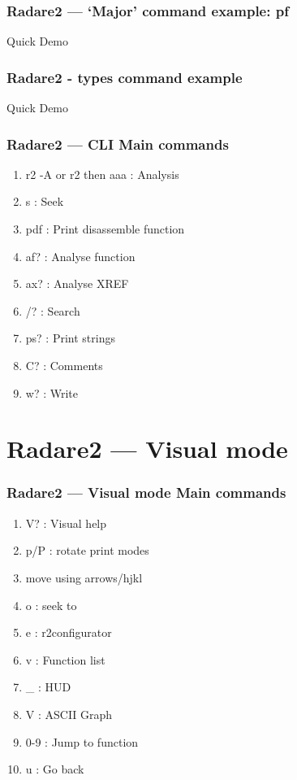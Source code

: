 \documentclass[10pt,pdf,utf8,english,compress,hyperref={unicode}]{beamer}
\begin{document}
\begin{frame}[fragile]
  \frametitle{Radare2 — `Major' command example: pf}
  Quick Demo
\end{frame}

\begin{frame}[fragile]
  \frametitle{Radare2 - types command example}
  Quick Demo
\end{frame}

\begin{frame}[fragile]
  \frametitle{Radare2 — CLI Main commands}
  \begin{enumerate}
   \item r2 -A or r2 then aaa : Analysis
   \item s : Seek
   \item pdf : Print disassemble function
   \item af? : Analyse function
   \item ax? : Analyse XREF
   \item /? : Search
   \item ps? : Print strings
   \item C? : Comments
   \item w? : Write
 \end{enumerate}
\end{frame}

\section{Radare2 — Visual mode}
\begin{frame}[fragile]
  \frametitle{Radare2 — Visual mode Main commands}
  \begin{enumerate}
  \item V? : Visual help
  \item p/P : rotate print modes
  \item move using arrows/hjkl
  \item o : seek to
  \item e : r2configurator
  \item v : Function list
  \item \_ : HUD
  \item V : ASCII Graph
  \item 0-9 : Jump to function
  \item u : Go back
 \end{enumerate}
\end{frame}
\end{document}
